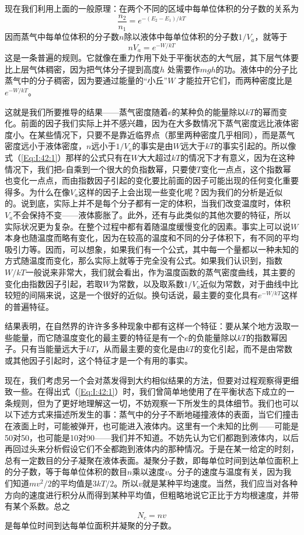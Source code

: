 现在我们利用上面的一般原理：在两个不同的区域中每单位体积的分子数的关系为
\begin{equation*}
    \frac{n_2}{n_1} = e^{-(E_2 - E_1)/kT}
\end{equation*}
因而蒸气中每单位体积的分子数$n$除以液体中每单位体积的分子数$1/V_a$，就等于
\begin{equation}
    \label{Eq:I:42:1}
    nV_a=e^{-W/kT}
\end{equation}
这是一条普遍的规则。它就像在重力作用下处于平衡状态的大气层，其下层气体要比上层气体稠密，因为把气体分子提到高度$h$ 处需要作$mgh$的功。液体中的分子比蒸气中的分子稠密，因为要通过能量的“小丘”$W$ 才能拉开它们，而两种密度比是$e^{-W/kT}$。

这就是我们所要推导的结果——蒸气密度随着$e$的某种负的能量除以$kT$的幂而变化。前面的因子我们实际上并不感兴趣，因为在大多数情况下蒸气密度远比液体密度小。在某些情况下，只要不是靠近临界点（那里两种密度几乎相同），而是蒸气密度远小于液体密度，$n$远小于$1/V_a$的事实是由$W$远大于$kT$的事实引起的。所以像式（\ref{Eq:I:42:1}）那样的公式只有在$W$大大超过$kT$的情况下才有意义，因为在这种情况下，我们把$e$自乘到一个很大的负指数幂，只要使$T$变化一点点，这个指数幂也变化一点点，而由指数因子引起的变化要比前面的因子可能出现的任何变化重要得多。为什么在像$V_a$这样的因子上会出现一些变化呢？因为我们的分析是近似的。说到底，实际上并不是每个分子都有一定的体积，当我们改变温度时，体积$V_a$不会保持不变——液体膨胀了。此外，还有与此类似的其他次要的特征，所以实际状况更为复杂。在整个过程中都有着随温度缓慢变化的因素。事实上可以说$W$本身也随温度而略有变化，因为在较高的温度和不同的分子体积下，有不同的平均吸引力等。因而，可以想象，如果我们有一个公式，其中每一个量都以一种未知的方式随温度而变化，那么实际上就等于完全没有公式。如果我们认识到，指数$W/kT$一般说来非常大，我们就会看出，作为温度函数的蒸气密度曲线，其主要的变化由指数因子引起，若取$W$为常数，以及取系数$1/V_a$近似为常数，对于曲线中比较短的间隔来说，这是一个很好的近似。换句话说，最主要的变化具有$e^{-W/kT}$这样的普遍特征。

结果表明，在自然界的许许多多种现象中都有这样一个特征：要从某个地方汲取一些能量，而它随温度变化的最主要的特征是有一个$e$的负能量除以$kT$的指数幂因子。只有当能量远大于$kT$，从而最主要的变化是由$kT$的变化引起，而不是由常数或其他因子引起时，这个特征才是一个有用的事实。

现在，我们考虑另一个会对蒸发得到大约相似结果的方法，但要对过程观察得更细致一些。在得出式（\ref{Eq:I:42:1}）时，我们曾简单地使用了在平衡状态下成立的一条规则，但为了更好地理解这一切，不妨观察一下所发生的具体细节。我们也可以以下述方式来描述所发生的事：蒸气中的分子不断地碰撞液体的表面，当它们撞击在液面上时，可能被弹开，也可能进入液体内。这里有一个未知的比例——可能是50对50，也可能是10对90——我们并不知道。不妨先认为它们都跑到液体内，以后再回过头来分析假设它们不全都跑到液体内的那种情况。于是在某一给定的时刻，总有一定数目的分子凝聚在液体表面。凝聚分子数，即每单位时间到达单位面积上的分子数，等于每单位体积的数目$n$乘以速度$v$。分子的速度与温度有关，因为我们知道$mv^2/2$的平均值是$3kT/2$。所以$v$就是某种平均速度。当然，我们应当对各种方向的速度进行积分从而得到某种平均值，但粗略地说它正比于方均根速度，并带有某个系数。总之
\begin{equation}
    \label{Eq:I:42:2}
    N_c=nv
\end{equation}
是每单位时间到达每单位面积并凝聚的分子数。

